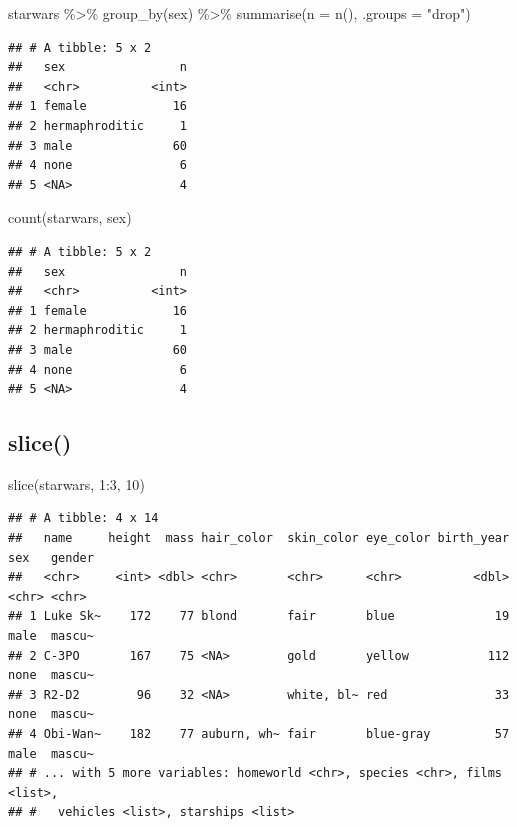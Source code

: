 \documentclass[
  oneside]{book}
\newenvironment{Shaded}{\begin{snugshade}}{\end{snugshade}}
\newcommand{\AttributeTok}[1]{\textcolor[rgb]{0.77,0.63,0.00}{#1}}
\newcommand{\DecValTok}[1]{\textcolor[rgb]{0.00,0.00,0.81}{#1}}
\newcommand{\FunctionTok}[1]{\textcolor[rgb]{0.00,0.00,0.00}{#1}}
\newcommand{\NormalTok}[1]{#1}
\newcommand{\SpecialCharTok}[1]{\textcolor[rgb]{0.00,0.00,0.00}{#1}}
\newcommand{\StringTok}[1]{\textcolor[rgb]{0.31,0.60,0.02}{#1}}
\begin{document}
\begin{Shaded}
\begin{Highlighting}[]
\NormalTok{starwars }\SpecialCharTok{\%\textgreater{}\%}
  \FunctionTok{group\_by}\NormalTok{(sex) }\SpecialCharTok{\%\textgreater{}\%}
  \FunctionTok{summarise}\NormalTok{(}\AttributeTok{n =} \FunctionTok{n}\NormalTok{(), }\AttributeTok{.groups =} \StringTok{"drop"}\NormalTok{)}
\end{Highlighting}
\end{Shaded}

\begin{verbatim}
## # A tibble: 5 x 2
##   sex                n
##   <chr>          <int>
## 1 female            16
## 2 hermaphroditic     1
## 3 male              60
## 4 none               6
## 5 <NA>               4
\end{verbatim}

\begin{Shaded}
\begin{Highlighting}[]
\FunctionTok{count}\NormalTok{(starwars, sex)}
\end{Highlighting}
\end{Shaded}

\begin{verbatim}
## # A tibble: 5 x 2
##   sex                n
##   <chr>          <int>
## 1 female            16
## 2 hermaphroditic     1
## 3 male              60
## 4 none               6
## 5 <NA>               4
\end{verbatim}

\hypertarget{slice}{%
\subsection{slice()}\label{slice}}

\begin{Shaded}
\begin{Highlighting}[]
\FunctionTok{slice}\NormalTok{(starwars, }\DecValTok{1}\SpecialCharTok{:}\DecValTok{3}\NormalTok{, }\DecValTok{10}\NormalTok{)}
\end{Highlighting}
\end{Shaded}

\begin{verbatim}
## # A tibble: 4 x 14
##   name     height  mass hair_color  skin_color eye_color birth_year sex   gender
##   <chr>     <int> <dbl> <chr>       <chr>      <chr>          <dbl> <chr> <chr> 
## 1 Luke Sk~    172    77 blond       fair       blue              19 male  mascu~
## 2 C-3PO       167    75 <NA>        gold       yellow           112 none  mascu~
## 3 R2-D2        96    32 <NA>        white, bl~ red               33 none  mascu~
## 4 Obi-Wan~    182    77 auburn, wh~ fair       blue-gray         57 male  mascu~
## # ... with 5 more variables: homeworld <chr>, species <chr>, films <list>,
## #   vehicles <list>, starships <list>
\end{verbatim}
\end{document}
